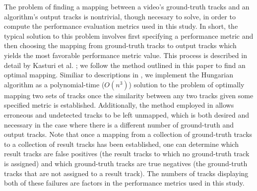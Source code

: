 \documentclass[smallcondensed, final]{svjour3}
\begin{document}
The problem of finding a mapping between a video's ground-truth tracks and an algorithm's output tracks is nontrivial, though necesary to solve, in order to compute the performance evaluation metrics used in this study. In short, the typical solution to this problem involves first specifying a performance metric and then choosing the mapping from ground-truth tracks to output tracks which yields the most favorable performance metric value. This process is described in detail by Kasturi et al. \cite{kasturi_2008}; we follow the method outlined in this paper to find an optimal mapping. Similiar to descriptions in \cite{kasturi_2008}, we implement the Hungarian algorithm \cite{munkres_1957} as a polynomial-time ($O(n^{3})$) solution to the problem of optimally mapping two sets of tracks once the similarity between any two tracks given some specified metric is established. Additionally, the method employed in \cite{kasturi_2008} allows erroneous and undetected tracks to be left unmapped, which is both desired and necessary in the case where there is a different number of ground-truth and output tracks. Note that once a mapping from a collection of ground-truth tracks to a collection of result tracks has been established, one can determine which result tracks are false positives (the result tracks to which no ground-truth track is assigned) and which ground-truth tracks are true negatives (the ground-truth tracks that are not assigned to a result track). The numbers of tracks displaying both of these failures are factors in the performance metrics used in this study.




\end{document}
